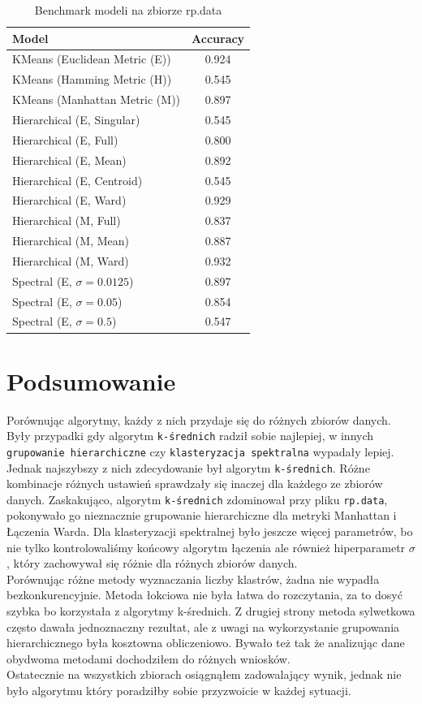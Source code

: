 \documentclass[polish,12pt,a4paper]{extarticle}
\begin{document}
\begin{table}[h!]
\centering
\begin{tabular}{|l|c|}
\hline
\textbf{Model} & \textbf{Accuracy} \\
\hline
KMeans (Euclidean Metric (E)) & 0.924 \\
KMeans (Hamming Metric (H)) & 0.545 \\
KMeans (Manhattan Metric (M)) & 0.897 \\
Hierarchical (E, Singular) & 0.545 \\
Hierarchical (E, Full) & 0.800 \\
Hierarchical (E, Mean) & 0.892 \\
Hierarchical (E, Centroid) & 0.545 \\
Hierarchical (E, Ward) & 0.929 \\
Hierarchical (M, Full) & 0.837 \\
Hierarchical (M, Mean) & 0.887 \\
Hierarchical (M, Ward) & 0.932 \\
Spectral (E, $\sigma = 0.0125$) & 0.897 \\
Spectral (E, $\sigma = 0.05$) & 0.854 \\
Spectral (E, $\sigma = 0.5$) & 0.547 \\
\hline
\end{tabular}
\caption{Benchmark modeli na zbiorze rp.data}
\end{table}

\section{Podsumowanie}
Porównując algorytmy, każdy z nich przydaje się do różnych zbiorów danych. Były przypadki gdy algorytm \texttt{k-średnich} radził sobie najlepiej, w innych \texttt{grupowanie hierarchiczne} czy \texttt{klasteryzacja spektralna} wypadały lepiej. Jednak najszybszy z nich zdecydowanie był algorytm \texttt{k-średnich}. Różne kombinacje różnych ustawień sprawdzały się inaczej dla każdego ze zbiorów danych. Zaskakująco, algorytm \texttt{k-średnich} zdominował przy pliku \texttt{rp.data}, pokonywało go nieznacznie grupowanie hierarchiczne dla metryki Manhattan i Łączenia Warda. Dla klasteryzacji spektralnej było jeszcze więcej parametrów, bo nie tylko kontrolowaliśmy końcowy algorytm łączenia ale również hiperparametr $\sigma$, który zachowywał się różnie dla różnych zbiorów danych. \smallskip \\
Porównując różne metody wyznaczania liczby klastrów, żadna nie wypadła bezkonkurencyjnie. Metoda łokciowa nie była łatwa do rozczytania, za to dosyć szybka bo korzystała z algorytmy k-średnich. Z drugiej strony metoda sylwetkowa często dawała jednoznaczny rezultat, ale z uwagi na wykorzystanie grupowania hierarchicznego była kosztowna obliczeniowo. Bywało też tak że analizując dane obydwoma metodami dochodziłem do różnych wniosków. \smallskip \\
Ostatecznie na wszystkich zbiorach osiągnąłem zadowalający wynik, jednak nie było algorytmu który poradziłby sobie przyzwoicie w każdej sytuacji.
\end{document}
